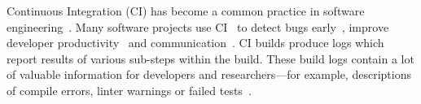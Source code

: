 





Continuous Integration (CI) has become a common practice in software
engineering~\cite{hilton2016usage}.
Many software projects use
CI~\cite{hilton2016usage,staahl2014modeling,beller2017oops} to detect
bugs early~\cite{vasilescu2015quality,duvall2007continuous}, improve
developer productivity~\cite{miller2008hundred,hilton2016usage} and
communication~\cite{downs2012ambient}.
CI builds produce logs which
report results of various sub-steps within the build.
These build logs
contain a lot of valuable information for developers and researchers---for
example, descriptions of compile errors, linter warnings or failed
tests~\cite{beller2017oops,seo2014programmers,vassallo2017a-tale}.

